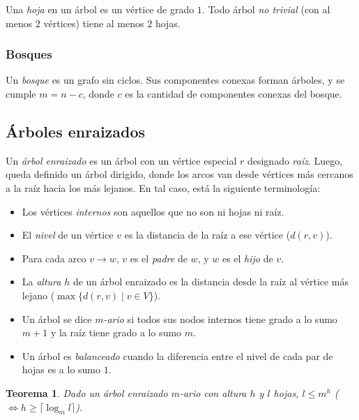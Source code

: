\documentclass[a4paper]{report}
\newtheorem*{theorem*}{Teorema}
\begin{document}
Una \textit{hoja} en un árbol es un vértice de grado $1$. Todo árbol \textit{no trivial} (con al menos $2$ vértices) tiene al menos $2$ hojas.


\subsubsection{Bosques}

Un \textit{bosque} es un grafo sin ciclos. Sus componentes conexas forman árboles, y se cumple $m = n - c$, donde $c$ es la cantidad de componentes conexas del bosque.


\subsection{Árboles enraizados}

Un \textit{árbol enraizado} es un árbol con un vértice especial $r$ designado \textit{raíz}. Luego, queda definido un árbol dirigido, donde los arcos van desde vértices más cercanos a la raíz hacia los más lejanos. En tal caso, está la siguiente terminología:
\begin{itemize}
    \item Los vértices \textit{internos} son aquellos que no son ni hojas ni raíz.
    \item El \textit{nivel} de un vértice $v$ es la distancia de la raíz a ese vértice ($d(r, v)$).
    \item Para cada arco $v \rightarrow w$, $v$ es el \textit{padre} de $w$, y $w$ es el \textit{hijo} de $v$.
    \item La \textit{altura} $h$ de un árbol enraizado es la distancia desde la raíz al vértice más lejano ($\max{\{d(r, v) \mid v \in V\}}$).
    \item Un árbol se dice \textit{$m$-ario} si todos sus nodos internos tiene grado a lo sumo $m + 1$ y la raíz tiene grado a lo sumo $m$.
    \item Un árbol es \textit{balanceado} cuando la diferencia entre el nivel de cada par de hojas es a lo sumo $1$.
\end{itemize}

\begin{theorem*}
    Dado un árbol enraizado $m$-ario con altura $h$ y $l$ hojas, $l \leq m^h$ ($\iff h \geq \lceil\log_m{l}\rceil$).
\end{theorem*}
\end{document}
